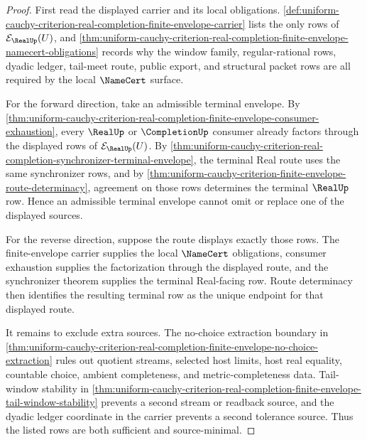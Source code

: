 \begin{proof}
First read the displayed carrier and its local obligations. \autoref{def:uniform-cauchy-criterion-real-completion-finite-envelope-carrier} lists the only rows of $\mathcal{E}_{\RealUp}(U)$, and \autoref{thm:uniform-cauchy-criterion-real-completion-finite-envelope-namecert-obligations} records why the window family, regular-rational rows, dyadic ledger, tail-meet route, public export, and structural packet rows are all required by the local $\NameCert$ surface.

For the forward direction, take an admissible terminal envelope. By \autoref{thm:uniform-cauchy-criterion-real-completion-finite-envelope-consumer-exhaustion}, every $\RealUp$ or $\CompletionUp$ consumer already factors through the displayed rows of $\mathcal{E}_{\RealUp}(U)$. By \autoref{thm:uniform-cauchy-criterion-real-completion-synchronizer-terminal-envelope}, the terminal Real route uses the same synchronizer rows, and by \autoref{thm:uniform-cauchy-criterion-finite-envelope-route-determinacy}, agreement on those rows determines the terminal $\RealUp$ row. Hence an admissible terminal envelope cannot omit or replace one of the displayed sources.

For the reverse direction, suppose the route displays exactly those rows. The finite-envelope carrier supplies the local $\NameCert$ obligations, consumer exhaustion supplies the factorization through the displayed route, and the synchronizer theorem supplies the terminal Real-facing row. Route determinacy then identifies the resulting terminal row as the unique endpoint for that displayed route.

It remains to exclude extra sources. The no-choice extraction boundary in \autoref{thm:uniform-cauchy-criterion-real-completion-finite-envelope-no-choice-extraction} rules out quotient streams, selected host limits, host real equality, countable choice, ambient completeness, and metric-completeness data. Tail-window stability in \autoref{thm:uniform-cauchy-criterion-real-completion-finite-envelope-tail-window-stability} prevents a second stream or readback source, and the dyadic ledger coordinate in the carrier prevents a second tolerance source. Thus the listed rows are both sufficient and source-minimal.
\end{proof}


